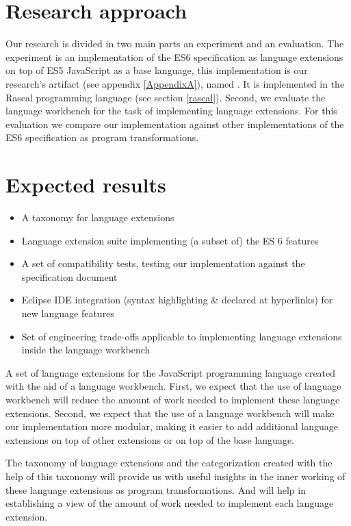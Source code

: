 \section{Research approach}
Our research is divided in two main parts an experiment and an evaluation. The experiment is an implementation of the ES6 specification as language extensions on top of ES5 JavaScript as a base language, this implementation is our research's artifact (see appendix \ref{AppendixA}), named \textit{\projectname}. It is implemented in the Rascal programming language (see section \ref{rascal}). Second, we evaluate the language workbench for the task of implementing language extensions. For this evaluation we compare our implementation against other implementations of the ES6 specification as program transformations.

\section{Expected results}
\begin{itemize}
	\item A taxonomy for language extensions
	\item Language extension suite implementing (a subset of) the ES 6 features
	\item A set of compatibility tests, testing our implementation against the specification document
	\item Eclipse IDE integration (syntax highlighting \& declared at hyperlinks) for new language features
	\item Set of engineering trade-offs applicable to implementing language extensions inside the language workbench
\end{itemize}

A set of language extensions for the JavaScript programming language created with the aid of a language workbench. First, we expect that the use of language workbench will reduce the amount of work needed to implement these language extensions. Second, we expect that the use of a language workbench will make our implementation more modular, making it easier to add additional language extensions on top of other extensions or on top of the base language. 

The taxonomy of language extensions and the categorization created with the help of this taxonomy will provide us with useful insights in the inner working of these language extensions as program transformations. And will help in establishing a view of the amount of work needed to implement each language extension.

